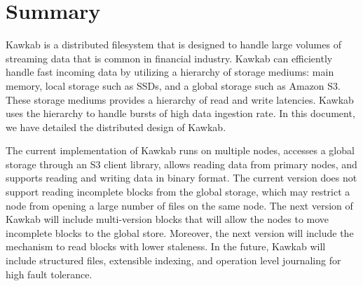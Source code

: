 \documentclass[]{article}
\begin{document}
\section{Summary}
Kawkab is a distributed filesystem that is designed to handle large volumes
of streaming data that is common in financial industry. Kawkab can efficiently
handle fast incoming data by utilizing a hierarchy of storage mediums:
main memory, local storage such as SSDs, and a global storage such as Amazon S3.
These storage mediums provides a hierarchy of read and write latencies.
Kawkab uses the hierarchy to handle bursts of high data ingestion rate.
In this document, we have detailed the distributed design of Kawkab.

The current implementation of Kawkab runs on multiple nodes, accesses
a global storage through an S3 client library, allows reading data from
primary nodes, and supports reading and writing data in binary format.
The current version does not support reading incomplete blocks from the
global storage, which may restrict a node from opening a large number
of files on the same node.
The next version of Kawkab will include multi-version blocks that
will allow the nodes to move incomplete blocks to the global store. Moreover,
the next version will include the mechanism to read blocks with lower
staleness. In the future, Kawkab will include structured files, extensible
indexing, and operation level journaling for high fault tolerance.




%
%
%
%
%
\end{document}
